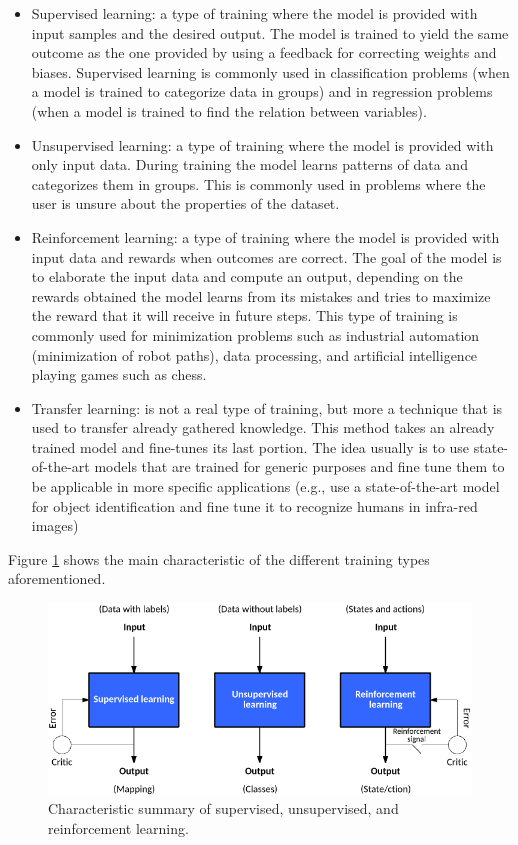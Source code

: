 \documentclass[12pt]{report}
\begin{document}
\begin{itemize}
\item Supervised learning: a type of training where the model is provided with input samples and the desired output. The model is trained to yield the same outcome as the one provided by using a feedback for correcting weights and biases. Supervised learning is commonly used in classification problems (when a model is trained to categorize data in groups) and in regression problems (when a model is trained to find the relation between variables).
\item Unsupervised learning: a type of training where the model is provided with only input data. During training the model learns patterns of data and categorizes them in groups. This is commonly used in problems where the user is unsure about the properties of the dataset.
\item Reinforcement learning: a type of training where the model is provided with input data and rewards when outcomes are correct. The goal of the model is to elaborate the input data and compute an output, depending on the rewards obtained the model learns from its mistakes and tries to maximize the reward that it will receive in future steps. This type of training is commonly used for minimization problems such as industrial automation (minimization of robot paths), data processing, and artificial intelligence playing games such as chess.
\item Transfer learning: is not a real type of training, but more a technique that is used to transfer already gathered knowledge. This method takes an already trained model and fine-tunes its last portion. The idea usually is to use state-of-the-art models that are trained for generic purposes and fine tune them to be applicable in more specific applications (e.g., use a state-of-the-art model for object identification and fine tune it to recognize humans in infra-red images)
\end{itemize}

Figure \ref{fig:supervised} shows the main characteristic of the different training types aforementioned.

\begin{figure}[h!]
    \centering
    \includegraphics[width=140mm]{Figures/Chapter1/supervised.png} 
    \caption{Characteristic summary of supervised, unsupervised, and reinforcement learning.}
    \label{fig:supervised}    
\end{figure}
\end{document}
